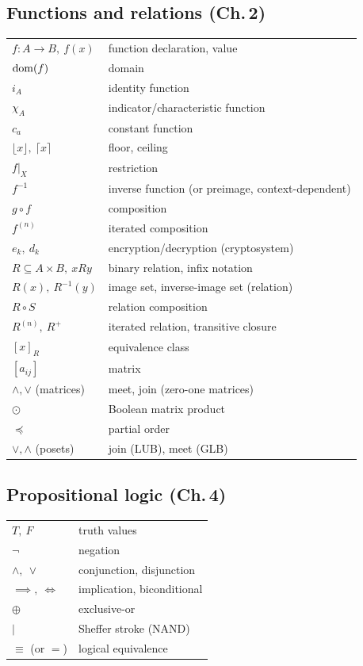 \subsection*{Functions and relations (Ch.\,2)}
\begin{longtable}{ll}
$f:A\to B,\ f(x)$ & function declaration, value \\
$\operatorname{dom}(f)$ & domain \\
$i_A$ & identity function \\
$\chi_A$ & indicator/characteristic function \\
$c_a$ & constant function \\
$\lfloor x\rfloor,\ \lceil x\rceil$ & floor, ceiling \\
$f|_X$ & restriction \\
$f^{-1}$ & inverse function (or preimage, context-dependent) \\
$g\circ f$ & composition \\
$f^{(n)}$ & iterated composition \\
$e_k,\ d_k$ & encryption/decryption (cryptosystem) \\
$R \subseteq A\times B,\ xRy$ & binary relation, infix notation \\
$R(x),\ R^{-1}(y)$ & image set, inverse-image set (relation) \\
$R\circ S$ & relation composition \\
$R^{(n)},\ R^+$ & iterated relation, transitive closure \\
$[x]_R$ & equivalence class \\
$[a_{ij}]$ & matrix \\
$\wedge,\vee$ (matrices) & meet, join (zero-one matrices) \\
$\odot$ & Boolean matrix product \\
$\preceq$ & partial order \\
$\vee,\wedge$ (posets) & join (LUB), meet (GLB) \\
\end{longtable}

\subsection*{Propositional logic (Ch.\,4)}
\begin{longtable}{ll}
$T,\ F$ & truth values \\
$\neg$ & negation \\
$\wedge,\ \vee$ & conjunction, disjunction \\
$\implies,\ \iff$ & implication, biconditional \\
$\oplus$ & exclusive-or \\
$\mid$ & Sheffer stroke (NAND) \\
$\equiv$ (or $=$) & logical equivalence \\
\end{longtable}

